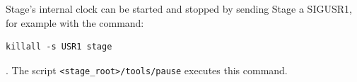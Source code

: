\documentclass[11pt,twoside]{report}
\begin{document}
Stage's internal clock can be started and stopped by sending Stage a
SIGUSR1, for example with the command:
\begin{verbatim}
killall -s USR1 stage
\end{verbatim}.
The script \verb'<stage_root>/tools/pause' executes this command.







\end{document}
